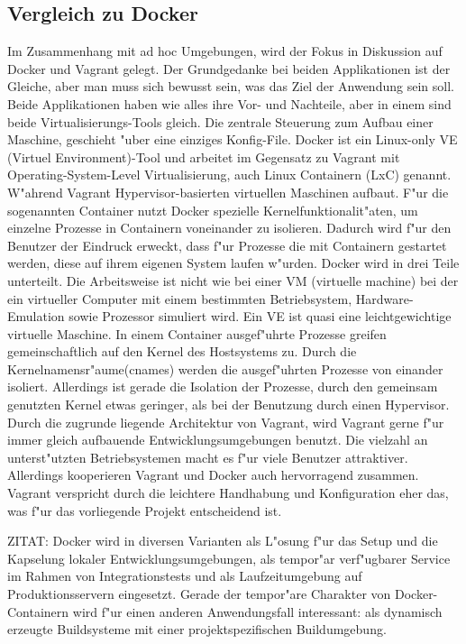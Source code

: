 \subsection{Vergleich zu Docker}
Im Zusammenhang mit ad hoc Umgebungen, wird der Fokus in Diskussion auf Docker und Vagrant gelegt.
Der Grundgedanke bei beiden Applikationen ist der Gleiche, aber man muss sich bewusst sein, was das Ziel der Anwendung sein soll.
Beide Applikationen haben wie alles ihre Vor- und Nachteile, aber in einem sind beide Virtualisierungs-Tools gleich. Die zentrale Steuerung zum Aufbau einer Maschine, geschieht "uber eine einziges Konfig-File.\newline
Docker ist ein Linux-only VE (Virtuel Environment)-Tool und arbeitet im Gegensatz zu Vagrant mit Operating-System-Level Virtualisierung, auch Linux Containern (LxC) genannt. W"ahrend Vagrant Hypervisor-basierten virtuellen Maschinen aufbaut.
F"ur die sogenannten Container nutzt Docker spezielle Kernelfunktionalit"aten, um einzelne Prozesse in Containern voneinander zu isolieren.\newline 
Dadurch wird f"ur den Benutzer der Eindruck erweckt, dass f"ur Prozesse die mit Containern gestartet werden, diese auf ihrem eigenen System laufen w"urden.
Docker wird in drei Teile unterteilt. Die Arbeitsweise ist nicht wie bei einer VM (virtuelle machine) bei der ein virtueller Computer mit einem bestimmten Betriebsystem, Hardware-Emulation sowie Prozessor simuliert wird. Ein VE ist quasi eine leichtgewichtige virtuelle Maschine. In einem Container ausgef"uhrte Prozesse greifen gemeinschaftlich auf den Kernel des Hostsystems zu. Durch die Kernelnamensr"aume(cnames) werden die ausgef"uhrten Prozesse von einander isoliert. Allerdings ist gerade die Isolation der Prozesse, durch den gemeinsam genutzten Kernel etwas geringer, als bei der Benutzung durch einen Hypervisor.\newline
Durch die zugrunde liegende Architektur von Vagrant, wird Vagrant gerne f"ur immer gleich aufbauende Entwicklungsumgebungen benutzt.
Die vielzahl an unterst"utzten Betriebsystemen macht es f"ur viele Benutzer attraktiver. Allerdings kooperieren Vagrant und Docker auch hervorragend zusammen.
Vagrant verspricht durch die leichtere Handhabung und Konfiguration eher das, was f"ur das vorliegende Projekt entscheidend ist.



ZITAT: Docker wird in diversen Varianten als L"osung f"ur das Setup und die Kapselung lokaler Entwicklungsumgebungen, als tempor"ar verf"ugbarer Service im Rahmen von Integrationstests und als Laufzeitumgebung auf Produktionsservern eingesetzt. Gerade der tempor"are Charakter von Docker-Containern wird f"ur einen anderen Anwendungsfall interessant: als dynamisch erzeugte Buildsysteme mit einer projektspezifischen Buildumgebung.






